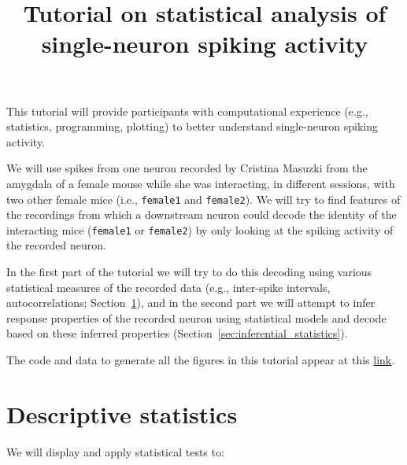 \documentclass[10pt]{article}
\title{Tutorial on statistical analysis of single-neuron spiking activity}
\author{}
\begin{document}
\maketitle

This tutorial will provide participants with computational experience
(e.g., statistics, programming, plotting) to better understand single-neuron
spiking activity.

We will use spikes from one neuron recorded by Cristina Masuzki from the
amygdala of a female mouse while she was interacting, in different sessions,
with two other female mice (i.e., \texttt{female1} and \texttt{female2}). We will try to find
features of the recordings from which a downstream neuron could decode the
identity of the interacting mice (\texttt{female1} or \texttt{female2}) by only looking at the
spiking activity of the recorded neuron.

In the first part of the tutorial we will try to do this decoding using various
statistical measures of the recorded data (e.g., inter-spike intervals,
autocorrelations; Section~\ref{sec:descriptive_statistics}), and in the second
part we will attempt to infer response properties of the recorded neuron using
statistical models and decode based on these inferred properties
(Section~\ref{sec:inferential_statistics}).

The code and data to generate all the figures in this tutorial appear at this
\href{https://github.com/joacorapela/singleNeuronSpikesAnalysisTutorial}{link}.

\section{Descriptive statistics}
\label{sec:descriptive_statistics}

We will display and apply statistical tests to:
\end{document}
